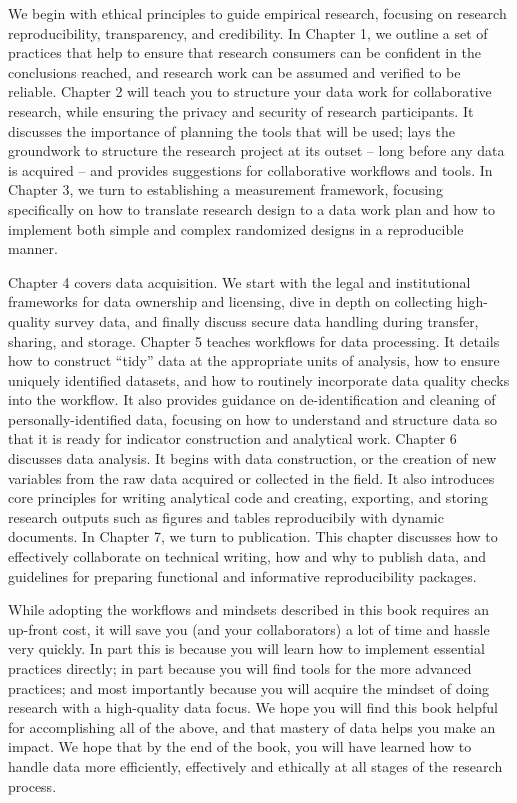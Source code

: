 We begin with ethical principles to guide empirical research,
focusing on research reproducibility, transparency, and credibility.
In Chapter 1, we outline a set of practices that help to ensure that
research consumers can be confident in the conclusions reached,
and research work can be assumed and verified to be reliable.
Chapter 2 will teach you to structure your data work for collaborative research,
while ensuring the privacy and security of research participants.
It discusses the importance of planning the tools that will be used;
lays the groundwork to structure the research project at its outset --
long before any data is acquired --
and provides suggestions for collaborative workflows and tools.
In Chapter 3, we turn to establishing a measurement framework,
focusing specifically on how to translate research design to a data work plan
and how to implement both simple and complex randomized designs in a reproducible manner.

Chapter 4 covers data acquisition. We start with
the legal and institutional frameworks for data ownership and licensing,
dive in depth on collecting high-quality survey data,
and finally discuss secure data handling during transfer, sharing, and storage.
Chapter 5 teaches workflows for data processing.
It details how to construct ``tidy'' data at the appropriate units of analysis,
how to ensure uniquely identified datasets, and
how to routinely incorporate data quality checks into the workflow.
It also provides guidance on de-identification and cleaning of personally-identified data,
focusing on how to understand and structure data
so that it is ready for indicator construction and analytical work.
Chapter 6 discusses data analysis.
It begins with data construction, or the creation of new variables
from the raw data acquired or collected in the field.
It also introduces core principles for writing analytical code
and creating, exporting, and storing research outputs such as figures and tables reproducibily with dynamic documents.
In Chapter 7, we turn to publication.
This chapter discusses
how to effectively collaborate on technical writing,
how and why to publish data,
and guidelines for preparing functional and informative reproducibility packages.

While adopting the workflows and mindsets described in this book requires an up-front cost,
it will save you (and your collaborators) a lot of time and hassle very quickly.
In part this is because you will learn how to implement essential practices directly;
in part because you will find tools for the more advanced practices;
and most importantly because you will acquire the mindset of doing research with a high-quality data focus.
We hope you will find this book helpful for accomplishing all of the above,
and that mastery of data helps you make an impact.
We hope that by the end of the book,
you will have learned how to handle data more efficiently, effectively and ethically
at all stages of the research process.

\mainmatter
